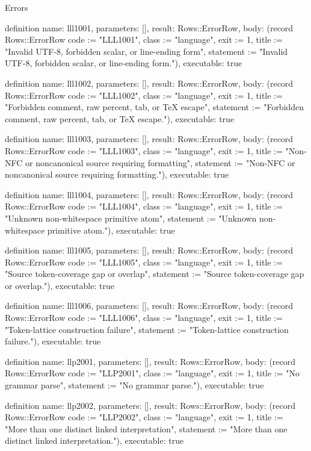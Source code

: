 \begin{lexlean}{Errors}
\begin{semanticmodule}
definition{
  name: lll1001,
  parameters: [],
  result: Rows::ErrorRow,
  body: (record Rows::ErrorRow {code := "LLL1001", class := "language", exit := 1, title := "Invalid UTF-8, forbidden scalar, or line-ending form", statement := "Invalid UTF-8, forbidden scalar, or line-ending form."}),
  executable: true
}

definition{
  name: lll1002,
  parameters: [],
  result: Rows::ErrorRow,
  body: (record Rows::ErrorRow {code := "LLL1002", class := "language", exit := 1, title := "Forbidden comment, raw percent, tab, or TeX escape", statement := "Forbidden comment, raw percent, tab, or TeX escape."}),
  executable: true
}

definition{
  name: lll1003,
  parameters: [],
  result: Rows::ErrorRow,
  body: (record Rows::ErrorRow {code := "LLL1003", class := "language", exit := 1, title := "Non-NFC or noncanonical source requiring formatting", statement := "Non-NFC or noncanonical source requiring formatting."}),
  executable: true
}

definition{
  name: lll1004,
  parameters: [],
  result: Rows::ErrorRow,
  body: (record Rows::ErrorRow {code := "LLL1004", class := "language", exit := 1, title := "Unknown non-whitespace primitive atom", statement := "Unknown non-whitespace primitive atom."}),
  executable: true
}

definition{
  name: lll1005,
  parameters: [],
  result: Rows::ErrorRow,
  body: (record Rows::ErrorRow {code := "LLL1005", class := "language", exit := 1, title := "Source token-coverage gap or overlap", statement := "Source token-coverage gap or overlap."}),
  executable: true
}

definition{
  name: lll1006,
  parameters: [],
  result: Rows::ErrorRow,
  body: (record Rows::ErrorRow {code := "LLL1006", class := "language", exit := 1, title := "Token-lattice construction failure", statement := "Token-lattice construction failure."}),
  executable: true
}

definition{
  name: llp2001,
  parameters: [],
  result: Rows::ErrorRow,
  body: (record Rows::ErrorRow {code := "LLP2001", class := "language", exit := 1, title := "No grammar parse", statement := "No grammar parse."}),
  executable: true
}

definition{
  name: llp2002,
  parameters: [],
  result: Rows::ErrorRow,
  body: (record Rows::ErrorRow {code := "LLP2002", class := "language", exit := 1, title := "More than one distinct linked interpretation", statement := "More than one distinct linked interpretation."}),
  executable: true
}


\end{semanticmodule}
\end{lexlean}
